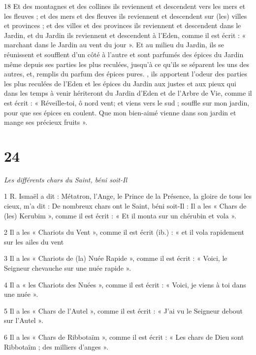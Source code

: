\par 18 Et des montagnes et des collines ils reviennent et descendent vers les mers et les fleuves ; et des mers et des fleuves ils reviennent et descendent sur (les) villes et provinces ; et des villes et des provinces ils reviennent et descendent dans le Jardin, et du Jardin ils reviennent et descendent à l'Eden, comme il est écrit : « marchant dans le Jardin au vent du jour ». Et au milieu du Jardin, ils se réunissent et soufflent d'un côté à l'autre et sont parfumés des épices du Jardin même depuis ses parties les plus reculées, jusqu'à ce qu'ils se séparent les uns des autres, et, remplis du parfum des épices pures. , ils apportent l'odeur des parties les plus reculées de l'Eden et les épices du Jardin aux justes et aux pieux qui dans les temps à venir hériteront du Jardin d'Eden et de l'Arbre de Vie, comme il est écrit : « Réveille-toi, ô nord vent; et viens vers le sud ; souffle sur mon jardin, pour que ses épices en coulent. Que mon bien-aimé vienne dans son jardin et mange ses précieux fruits ».

\chapter{24}

\par \textit{Les différents chars du Saint, béni soit-Il}

\par 1 R. Ismaël a dit : Métatron, l'Ange, le Prince de la Présence, la gloire de tous les cieux, m'a dit : De nombreux chars ont le Saint, béni soit-Il : Il a les « Chars de (les) Kerubim », comme il est écrit : « Et il monta sur un chérubin et vola ».

\par 2 Il a les « Chariots du Vent », comme il est écrit (ib.) : « et il vola rapidement sur les ailes du vent

\par 3 Il a les « Chariots de (la) Nuée Rapide », comme il est écrit : « Voici, le Seigneur chevauche sur une nuée rapide ».

\par 4 Il a « les Chariots des Nuées », comme il est écrit : « Voici, je viens à toi dans une nuée ».

\par 5 Il a les « Chars de l'Autel », comme il est écrit : « J'ai vu le Seigneur debout sur l'Autel ».

\par 6 Il a les « Chars de Ribbotaïm », comme il est écrit : « Les chars de Dieu sont Ribbotaïm ; des milliers d'anges ».

